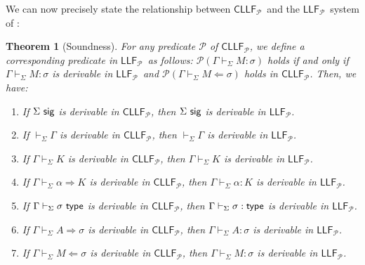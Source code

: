 \documentclass[submission,copyright,creativecommons]{eptcs}
\theoremstyle{plain}
\newtheorem{theorem}{Theorem}[section]
\theoremstyle{definition}
\newcommand{\LLFP}  {\mbox{$\mathsf{LLF}_{\mathcal P}$}}
\newcommand{\CLLFP} {\mbox{$\mathsf{CLLF}_{\mathcal P}$}}
\newcommand {\VDASHS} {\vdash_\Sigma} \newcommand {\VDASHO} {\vdash_\Omega} \newcommand {\VDASHCBV} {\vdash_{\Sigma_{{CBV}}}} \newcommand {\VDASHSIMP} {\vdash_{\Sigma_{{Imp}}}} \newcommand {\VDASHSHOARE} {\vdash_{\Sigma_{{Hoare}}}} \newcommand {\VDASHSERASE} {\vdash_{\Sigma^\Erase}}    \newcommand {\VDASHEAL} {\vdash_{EAL}} \newcommand {\VDASHSEAL} {\vdash_{\Sigma_{{EAL}}}} \newcommand {\VDASHFP} {\vdash_{\sf FPST}}
\renewcommand {\P} {\mathcal{P}} \newcommand {\Q} {\mathcal{Q}}
\renewcommand {\L} {\mathcal{L}} \newcommand   {\C} {\mathcal{C}} \newcommand   {\T} {\mathcal{T}} \newcommand   {\U} {\mathcal{U}}
\newcommand{\Erase} {{-\U\L}}
\begin{document}
We can now precisely state the relationship between \CLLFP\ and the
\LLFP\ system of \cite{HLMS15}:

\begin{theorem}[Soundness] For any predicate $\P$ of \CLLFP, we define
  a corresponding predicate in \LLFP\ as follows:
  $\P (\Gamma \VDASHS M : \sigma)$ holds if and only if
  $\Gamma \VDASHS M: \sigma$ is derivable in \LLFP\ and
  $\P(\Gamma \VDASHS M \Leftarrow \sigma)$ holds in \CLLFP. Then, we
  have:\vspace{-0.5ex}
  \begin{enumerate}
  \setlength\itemsep{-0.3ex}
\item If $ \Sigma\ {\mathsf {sig}}$ is derivable in \CLLFP, then $\Sigma \ {\mathsf {sig}}$
  is derivable in \LLFP.
  \item If $\VDASHS \Gamma$ is derivable in \CLLFP, then
    $\VDASHS \Gamma$ is derivable in \LLFP.
  \item If $\Gamma \VDASHS K$ is derivable in \CLLFP, then $\Gamma
    \VDASHS K$ is derivable in \LLFP.
  \item If $\Gamma \VDASHS \alpha \Rightarrow K$ is derivable in
    \CLLFP, then $\Gamma \VDASHS \alpha : K$ is derivable in \LLFP.
  \item If $\Gamma \VDASHS \sigma \ \Type$ is derivable in \CLLFP, then
    $\Gamma \VDASHS \sigma : \Type$ is derivable in \LLFP.
  \item If $\Gamma \VDASHS A \Rightarrow \sigma$ is derivable in
    \CLLFP, then $\Gamma \VDASHS A : \sigma$ is derivable in \LLFP.
  \item If $\Gamma \VDASHS M \Leftarrow \sigma$ is derivable in \CLLFP,
    then $\Gamma \VDASHS M : \sigma$ is derivable in \LLFP.
  \end{enumerate}
\end{theorem}
\end{document}
